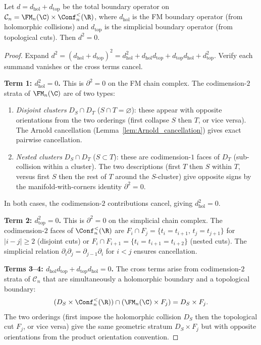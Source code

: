 \begin{theorem}[$d^2 = 0$ on $\mathcal{C}_n$ by
codimension-$2$ face cancellation; \ClaimStatusProvedHere]
Let $d = d_{\mathrm{hol}} + d_{\mathrm{top}}$ be the
total boundary operator on
$\mathcal{C}_n = \FM_n(\C) \times \Conf_n^<(\R)$,
where $d_{\mathrm{hol}}$ is the FM boundary operator
(from holomorphic collisions) and $d_{\mathrm{top}}$ is
the simplicial boundary operator (from topological
cuts). Then $d^2 = 0$.
\end{theorem}

\begin{proof}
Expand $d^2 = (d_{\mathrm{hol}} + d_{\mathrm{top}})^2
= d_{\mathrm{hol}}^2 + d_{\mathrm{hol}} d_{\mathrm{top}}
+ d_{\mathrm{top}} d_{\mathrm{hol}}
+ d_{\mathrm{top}}^2$. Verify each summand
vanishes or the cross terms cancel.

\medskip\noindent
\textbf{Term 1: $d_{\mathrm{hol}}^2 = 0$.}
This is $\partial^2 = 0$ on the FM chain complex.
The codimension-$2$ strata of $\FM_n(\C)$ are of two
types:
\begin{enumerate}[label=(\alph*)]
\item \emph{Disjoint clusters} $D_S \cap D_T$
 ($S \cap T = \varnothing$): these appear with opposite
 orientations from the two orderings
 (first collapse $S$ then $T$, or vice versa). The
 Arnold cancellation
 (Lemma~\ref{lem:Arnold_cancellation}) gives exact
 pairwise cancellation.

\item \emph{Nested clusters} $D_S \cap D_T$
 ($S \subset T$): these are codimension-$1$ faces
 of $D_T$ (sub-collision within a cluster). The
 two descriptions (first $T$ then $S$ within $T$,
 versus first $S$ then the rest of $T$ around the
 $S$-cluster) give opposite signs by the
 manifold-with-corners identity $\partial^2 = 0$.
\end{enumerate}
In both cases, the codimension-$2$ contributions cancel,
giving $d_{\mathrm{hol}}^2 = 0$.

\medskip\noindent
\textbf{Term 2: $d_{\mathrm{top}}^2 = 0$.}
This is $\partial^2 = 0$ on the simplicial chain complex.
The codimension-$2$ faces of $\Conf_n^<(\R)$ are
$F_i \cap F_j = \{t_i = t_{i+1},\, t_j = t_{j+1}\}$
for $|i - j| \ge 2$ (disjoint cuts) or
$F_i \cap F_{i+1} = \{t_i = t_{i+1} = t_{i+2}\}$
(nested cuts). The simplicial relation
$\partial_i \partial_j = \partial_{j-1} \partial_i$
for $i < j$ ensures cancellation.

\medskip\noindent
\textbf{Terms 3--4: $d_{\mathrm{hol}} d_{\mathrm{top}}
+ d_{\mathrm{top}} d_{\mathrm{hol}} = 0$.}
The cross terms arise from codimension-$2$ strata of
$\mathcal{C}_n$ that are simultaneously a holomorphic
boundary and a topological boundary:
\[
(D_S \times \Conf_n^<(\R))
\cap (\FM_n(\C) \times F_j)
= D_S \times F_j.
\]
The two orderings (first impose the holomorphic collision
$D_S$ then the topological cut $F_j$, or vice versa) give
the same geometric stratum $D_S \times F_j$ but with
opposite orientations from the product orientation
convention.


\end{proof}
